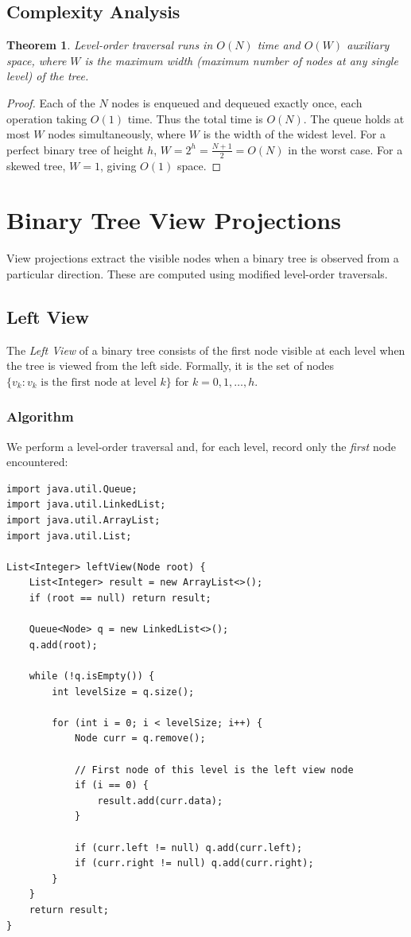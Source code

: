 \documentclass[10pt,journal,compsoc,onecolumn]{IEEEtran}
\newtheorem{theorem}{Theorem}
\begin{document}
\subsection{Complexity Analysis}
\begin{theorem}
Level-order traversal runs in $O(N)$ time and $O(W)$ auxiliary space, where $W$ is the maximum width (maximum number of nodes at any single level) of the tree.
\end{theorem}
\begin{proof}
Each of the $N$ nodes is enqueued and dequeued exactly once, each operation taking $O(1)$ time. Thus the total time is $O(N)$. The queue holds at most $W$ nodes simultaneously, where $W$ is the width of the widest level. For a perfect binary tree of height $h$, $W = 2^h = \frac{N+1}{2} = O(N)$ in the worst case. For a skewed tree, $W = 1$, giving $O(1)$ space.
\end{proof}

\section{Binary Tree View Projections}
\label{sec:views}

View projections extract the visible nodes when a binary tree is observed from a particular direction. These are computed using modified level-order traversals.

\subsection{Left View}

The \emph{Left View} of a binary tree consists of the first node visible at each level when the tree is viewed from the left side. Formally, it is the set of nodes $\{v_k : v_k \text{ is the first node at level } k\}$ for $k = 0, 1, \ldots, h$.

\subsubsection{Algorithm}
We perform a level-order traversal and, for each level, record only the \emph{first} node encountered:

\begin{verbatim}
import java.util.Queue;
import java.util.LinkedList;
import java.util.ArrayList;
import java.util.List;

List<Integer> leftView(Node root) {
    List<Integer> result = new ArrayList<>();
    if (root == null) return result;

    Queue<Node> q = new LinkedList<>();
    q.add(root);

    while (!q.isEmpty()) {
        int levelSize = q.size();

        for (int i = 0; i < levelSize; i++) {
            Node curr = q.remove();

            // First node of this level is the left view node
            if (i == 0) {
                result.add(curr.data);
            }

            if (curr.left != null) q.add(curr.left);
            if (curr.right != null) q.add(curr.right);
        }
    }
    return result;
}
\end{verbatim}
\end{document}
